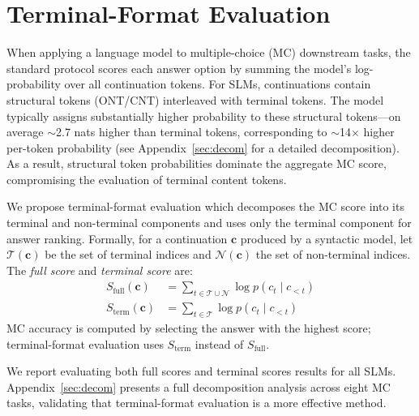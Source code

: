 \documentclass[11pt]{article}
\begin{document}
\section{Terminal-Format Evaluation}
\label{sec:terminal-format-evaluation}

When applying a language model to multiple-choice (MC) downstream tasks, the standard protocol scores each answer option by summing the model's log-probability over all continuation tokens.
For SLMs, continuations contain structural tokens (ONT/CNT) interleaved with terminal tokens. The model typically assigns substantially higher probability to these structural tokens---on average $\sim$2.7 nats higher than terminal tokens, corresponding to $\sim$14$\times$ higher per-token probability (see Appendix~\ref{sec:decom} for a detailed decomposition).
As a result, structural token probabilities dominate the aggregate MC score, compromising the evaluation of terminal content tokens.

We propose terminal-format evaluation which decomposes the MC score into its terminal and non-terminal components and uses only the terminal component for answer ranking.
Formally, for a continuation $\mathbf{c}$ produced by a syntactic model, let $\mathcal{T}(\mathbf{c})$ be the set of terminal indices and $\mathcal{N}(\mathbf{c})$ the set of non-terminal indices.
The \textit{full score} and \textit{terminal score} are:
\begin{align}
S_{\text{full}}(\mathbf{c}) &= \sum_{t \in \mathcal{T} \cup \mathcal{N}} \log p(c_t \mid c_{<t}) \\
S_{\text{term}}(\mathbf{c}) &= \sum_{t \in \mathcal{T}} \log p(c_t \mid c_{<t})
\label{eq:decom}
\end{align}
MC accuracy is computed by selecting the answer with the highest score; terminal-format evaluation uses $S_{\text{term}}$ instead of $S_{\text{full}}$.

We report evaluating both full scores and terminal scores results for all SLMs.
Appendix~\ref{sec:decom} presents a full decomposition analysis across eight MC tasks, validating that terminal-format evaluation is a more effective method.
\end{document}
